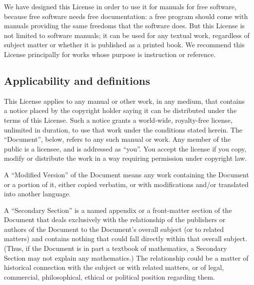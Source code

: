 {\tiny{}We have designed this License in order to use it for manuals
for free software, because free software needs free documentation:
a free program should come with manuals providing the same freedoms
that the software does. But this License is not limited to software
manuals; it can be used for any textual work, regardless of subject
matter or whether it is published as a printed book. We recommend
this License principally for works whose purpose is instruction or
reference.}{\tiny\par}

\subsection{Applicability and definitions\label{subsec:1Applicability-and-definitions}}

{\tiny{}This License applies to any manual or other work, in any medium,
that contains a notice placed by the copyright holder saying it can
be distributed under the terms of this License. Such a notice grants
a world-wide, royalty-free license, unlimited in duration, to use
that work under the conditions stated herein. The \textquotedblleft Document\textsf{''},
below, refers to any such manual or work. Any member of the public
is a licensee, and is addressed as \textquotedblleft you\textsf{''}. You accept
the license if you copy, modify or distribute the work in a way requiring
permission under copyright law.}{\tiny\par}

{\tiny{}A \textquotedblleft Modified Version\textsf{''} of the Document means
any work containing the Document or a portion of it, either copied
verbatim, or with modifications and/or translated into another language.}{\tiny\par}

{\tiny{}A \textquotedblleft Secondary Section\textsf{''} is a named appendix
or a front-matter section of the Document that deals exclusively with
the relationship of the publishers or authors of the Document to the
Document\textsf{'}s overall subject (or to related matters) and contains nothing
that could fall directly within that overall subject. (Thus, if the
Document is in part a textbook of mathematics, a Secondary Section
may not explain any mathematics.) The relationship could be a matter
of historical connection with the subject or with related matters,
or of legal, commercial, philosophical, ethical or political position
regarding them.}{\tiny\par}

